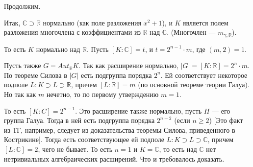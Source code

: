 \begin{solution}
Продолжим.

Итак, \(\mathbb{C} \supset \mathbb{R}\) нормально (как поле разложения \(x^2 + 1\)), и \(K\) является полем разложения многочлена с коэффициентами из \(\mathbb{R}\) над \(\mathbb{C}\). (Многочлен --- \(m_{\gamma, \mathbb{R}}\)).

То есть \(K\) нормально над \(\mathbb{R}\). Пусть \([K : \mathbb{C}] = t\), и \(t = 2^{n - 1} \cdot m\), где \((m, 2) = 1\).

Пусть также \(G = Aut_{\mathbb{R}}K\). Так как расширение нормально, \(|G| = [K : \mathbb{R}] = 2^n \cdot m\). По теореме Силова в \(|G|\) есть подгруппа порядка \(2^n\). Ей соответствует некоторое подполе \(L: K \supset L \supset \mathbb{R}\), причем \([L : \mathbb{R}] = m\) (по основной теореме теории Галуа). Но так как \(m\) нечетно, то по первому утверждению \(m = 1\).

То есть \([K : C] = 2^{n - 1}\). Это расширение также нормально, пусть \(H\) --- его группа Галуа. Тогда в ней есть подгруппа порядка \(2^{n - 2}\) (если \(n \geqslant 2\)) {[}Это факт из ТГ, например, следует из доказательства теоремы Силова, приведенного в Кострикине{]}. Тогда есть соответствующее ей подполе \(L: K \supset L \supset \mathbb{C}\), причем \([L : \mathbb{C}] = 2\), чего не бывает. То есть \(n = 1\) и \(K = \mathbb{C}\), то есть над \(\mathbb{C}\) нет нетривиальных алгебраических расширений. Что и требовалось доказать.
\end{solution}


